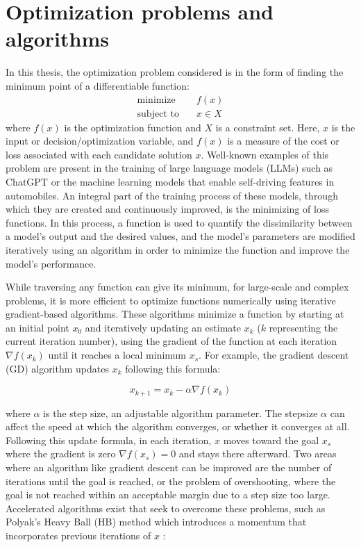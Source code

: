 \section{Optimization problems and algorithms} \label{OpPro}

In this thesis, the optimization problem considered is in the form of finding the minimum point of a differentiable function:
\begin{subequations}\label{opt prob}
  \begin{align*}
    \textrm{minimize} &\quad f(x) \\
    \textrm{subject to} &\quad x \in X
  \end{align*}
\end{subequations}
where \(f(x)\) is the optimization function and \(X\) is a constraint set. Here, \(x\) is the input or decision/optimization variable, and \(f(x)\) is a measure of the cost or loss associated with each candidate solution $x$. Well-known examples of this problem are present in the training of large language models (LLMs) such as ChatGPT or the machine learning models that enable self-driving features in automobiles. An integral part of the training process of these models, through which they are created and continuously improved, is the minimizing of loss functions. In this process, a function is used to quantify the dissimilarity between a model's output and the desired values, and the model's parameters are modified iteratively using an algorithm in order to minimize the function and improve the model's performance.

While traversing any function can give its minimum, for large-scale and complex problems, it is more efficient to optimize functions numerically using iterative gradient-based algorithms. These algorithms minimize a function by starting at an initial point \(x_{0}\) and iteratively updating an estimate \(x_k\) (\(k\) representing the current iteration number), using the gradient of the function at each iteration $\nabla f(x_k)$ until it reaches a local minimum \(x_s\). For example, the gradient descent (GD) algorithm updates \(x_k\) following this formula:

\begin{equation}\label{eqn:GD}
  x_{k+1}=x_{k}-\alpha \nabla f(x_k)
\end{equation}

where $\alpha$ is the step size, an adjustable algorithm parameter. The stepsize $\alpha$ can affect the speed at which the algorithm converges, or whether it converges at all. Following this update formula, in each iteration, \(x\) moves toward the goal \(x_s\) where the gradient is zero $\nabla f(x_s) = 0$ and stays there afterward. Two areas where an algorithm like gradient descent can be improved are the number of iterations until the goal is reached, or the problem of overshooting, where the goal is not reached within an acceptable margin due to a step size too large. Accelerated algorithms exist that seek to overcome these problems, such as Polyak’s Heavy Ball (HB) method which introduces a momentum that incorporates previous iterations of \(x\) \cite{HB}:


